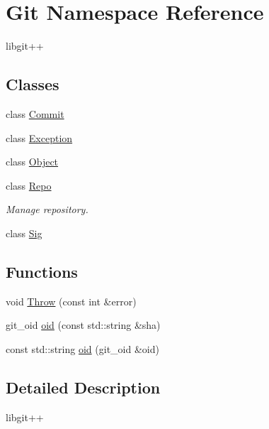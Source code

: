 \hypertarget{namespace_git}{\section{Git Namespace Reference}
\label{namespace_git}
}


libgit++  


\subsection*{Classes}
\begin{DoxyCompactItemize}
\item 
class \hyperlink{class_git_1_1_commit}{Commit}
\item 
class \hyperlink{class_git_1_1_exception}{Exception}
\item 
class \hyperlink{class_git_1_1_object}{Object}
\item 
class \hyperlink{class_git_1_1_repo}{Repo}
\begin{DoxyCompactList}\small\item\em Manage repository. \end{DoxyCompactList}\item 
class \hyperlink{class_git_1_1_sig}{Sig}
\end{DoxyCompactItemize}
\subsection*{Functions}
\begin{DoxyCompactItemize}
\item 
void \hyperlink{namespace_git_a278e75304a5420da6ca1611ce9ffddc0}{Throw} (const int \&error)
\item 
git\-\_\-oid \hyperlink{namespace_git_a20e639531f5c04252e0ce86622c2e77e}{oid} (const std\-::string \&sha)
\item 
const std\-::string \hyperlink{namespace_git_a7058573edae76cc2fbafcfe04e13dabc}{oid} (git\-\_\-oid \&oid)
\end{DoxyCompactItemize}


\subsection{Detailed Description}
libgit++ 

